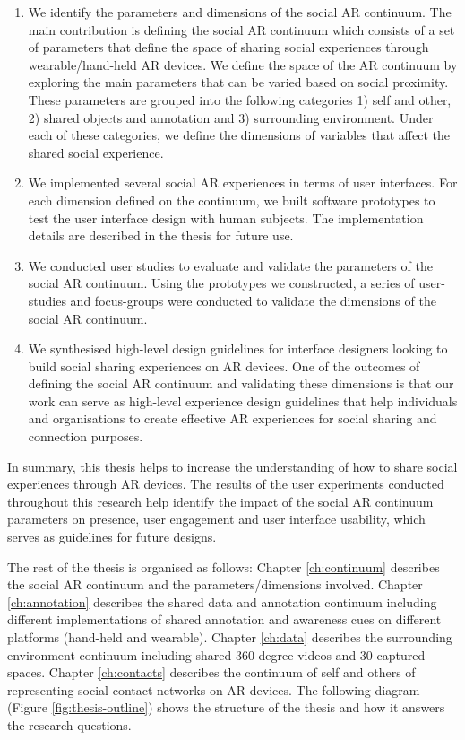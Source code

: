 \begin{enumerate}
    \item We identify the parameters and dimensions of the social AR continuum. The main contribution is defining the social AR continuum which consists of a set of parameters that define the space of sharing social experiences through wearable/hand-held AR devices. We define the space of the AR continuum by exploring the main parameters that can be varied based on social proximity. These parameters are grouped into the following categories 1) self and other, 2) shared objects and annotation and 3) surrounding environment. Under each of these categories, we define the dimensions of variables that affect the shared social experience.
    
    \item We implemented several social AR experiences in terms of user interfaces. For each dimension defined on the continuum, we built software prototypes to test the user interface design with human subjects. The implementation details are described in the thesis for future use.
    
    \item We conducted user studies to evaluate and validate the parameters of the social AR continuum. Using the prototypes we constructed, a series of user-studies and focus-groups were conducted to validate the dimensions of the social AR continuum.
    
    \item We synthesised high-level design guidelines for interface designers looking to build social sharing experiences on AR devices. One of the outcomes of defining the social AR continuum and validating these dimensions is that our work can serve as high-level experience design guidelines that help individuals and organisations to create effective AR experiences for social sharing and connection purposes.
\end{enumerate}

In summary, this thesis helps to increase the understanding of how to share social experiences through AR devices. The results of the user experiments conducted throughout this research help identify the impact of the social AR continuum parameters on presence, user engagement and user interface usability, which serves as guidelines for future designs. 

The rest of the thesis is organised as follows: Chapter \ref{ch:continuum} describes the social AR continuum and the parameters/dimensions involved. Chapter \ref{ch:annotation} describes the shared data and annotation continuum including different implementations of shared annotation and awareness cues on different platforms (hand-held and wearable). Chapter \ref{ch:data} describes the surrounding environment continuum including shared 360-degree videos and 30 captured spaces. Chapter \ref{ch:contacts} describes the continuum of self and others of representing social contact networks on AR devices. The following diagram (Figure \ref{fig:thesis-outline}) shows the structure of the thesis and how it answers the research questions. 

